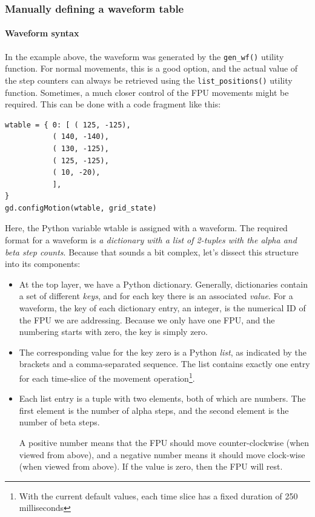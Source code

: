 \documentclass[11pt,a4paper]{scrartcl}
\begin{document}
\subsubsection{Manually defining a waveform table}
\label{sec:waveform_rules}
\paragraph{Waveform syntax}

In the example above, the waveform was generated by the
\texttt{gen\_wf()} utility function.  For normal movements, this is a
good option, and the actual value of the step counters can always be
retrieved using the \texttt{list\_positions()} utility
function. Sometimes, a much closer control of the FPU movements might
be required. This can be done with a code fragment like this:

\begin{verbatim}
wtable = { 0: [ ( 125, -125),
           ( 140, -140),
           ( 130, -125),
           ( 125, -125),
           ( 10, -20),
           ],
}
gd.configMotion(wtable, grid_state)
\end{verbatim}

Here, the Python variable wtable is assigned with
a waveform. The required format for a waveform
is \emph{a dictionary with a list of 2-tuples
  with the alpha and beta step counts}. Because
that sounds a bit complex, let's dissect this
structure into its components:

\begin{itemize}
  
\item At the top layer, we have a Python dictionary. Generally,
  dictionaries contain a set of different \emph{keys}, and for each
  key there is an associated \emph{value}. For a waveform, the key of
  each dictionary entry, an integer, is the numerical ID of the FPU we
  are addressing.  Because we only have one FPU, and the numbering
  starts with zero, the key is simply zero.

\item The corresponding value for the key zero is a Python
  \emph{list}, as indicated by the brackets and a comma-separated
  sequence. The list contains exactly one entry for each time-slice of
  the movement operation\footnote{With the current default values,
    each time slice has a fixed duration of 250 milliseconds}.

\item Each list entry is a tuple with two elements, both of which are
  numbers. The first element is the number of alpha steps, and the
  second element is the number of beta steps.

  A positive number means that the FPU should move counter-clockwise
  (when viewed from above), and a negative number means it should move
  clock-wise (when viewed from above). If the value is zero, then the
  FPU will rest.

\end{itemize}
\end{document}
